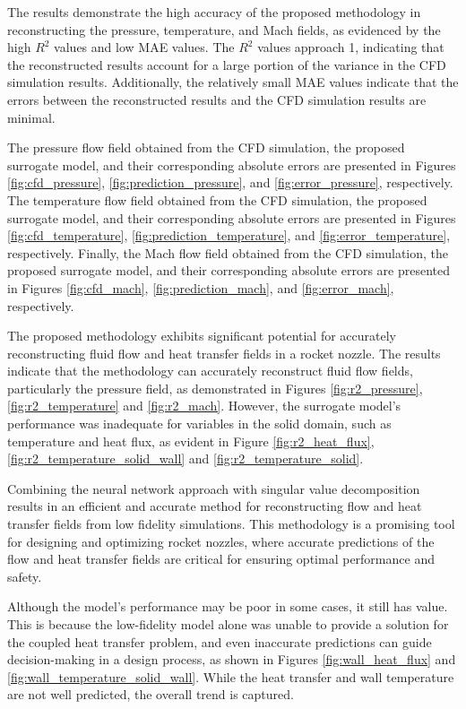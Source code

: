 \documentclass[10pt,oneside,a4paper,twocolumn]{article}
\begin{document}
The results demonstrate the high accuracy of the proposed methodology in reconstructing the pressure, temperature, and Mach fields, as evidenced by the high $R^2$ values and low MAE values. The $R^2$ values approach 1, indicating that the reconstructed results account for a large portion of the variance in the CFD simulation results. Additionally, the relatively small MAE values indicate that the errors between the reconstructed results and the CFD simulation results are minimal.

The pressure flow field obtained from the CFD simulation, the proposed surrogate model, and their corresponding absolute errors are presented in Figures \ref{fig:cfd_pressure}, \ref{fig:prediction_pressure}, and \ref{fig:error_pressure}, respectively. The temperature flow field obtained from the CFD simulation, the proposed surrogate model, and their corresponding absolute errors are presented in Figures \ref{fig:cfd_temperature}, \ref{fig:prediction_temperature}, and \ref{fig:error_temperature}, respectively. Finally, the Mach flow field obtained from the CFD simulation, the proposed surrogate model, and their corresponding absolute errors are presented in Figures \ref{fig:cfd_mach}, \ref{fig:prediction_mach}, and \ref{fig:error_mach}, respectively.


The proposed methodology exhibits significant potential for accurately reconstructing fluid flow and heat transfer fields in a rocket nozzle. The results indicate that the methodology can accurately reconstruct fluid flow fields, particularly the pressure field, as demonstrated in Figures \ref{fig:r2_pressure},\ref{fig:r2_temperature} and \ref{fig:r2_mach}. However, the surrogate model's performance was inadequate for variables in the solid domain, such as temperature and heat flux, as evident in Figure \ref{fig:r2_heat_flux},\ref{fig:r2_temperature_solid_wall} and \ref{fig:r2_temperature_solid}.


Combining the neural network approach with singular value decomposition results in an efficient and accurate method for reconstructing flow and heat transfer fields from low fidelity simulations. This methodology is a promising tool for designing and optimizing rocket nozzles, where accurate predictions of the flow and heat transfer fields are critical for ensuring optimal performance and safety.


Although the model's performance may be poor in some cases, it still has value. This is because the low-fidelity model alone was unable to provide a solution for the coupled heat transfer problem, and even inaccurate predictions can guide decision-making in a design process, as shown in Figures \ref{fig:wall_heat_flux} and \ref{fig:wall_temperature_solid_wall}. While the heat transfer and wall temperature are not well predicted, the overall trend is captured.
\end{document}
